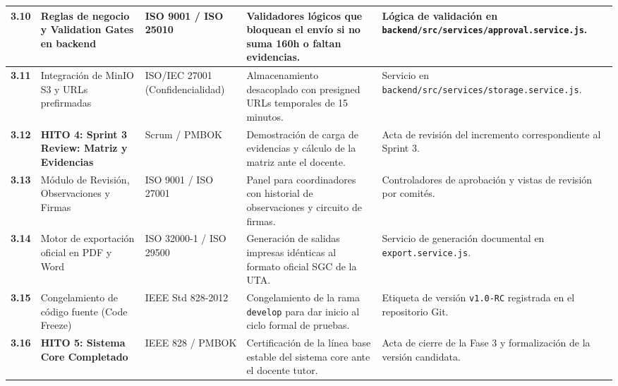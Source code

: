 \documentclass[12pt,a4paper]{article}
\begin{document}
\begin{longtable}{|>{\centering\arraybackslash}m{1.4cm}|>{\raggedright\arraybackslash}m{3.2cm}|>{\raggedright\arraybackslash}m{2.6cm}|>{\raggedright\arraybackslash}m{4.6cm}|>{\raggedright\arraybackslash}m{3.4cm}|}
\textbf{3.10} & Reglas de negocio y Validation Gates en backend & ISO 9001 / ISO 25010 & Validadores lógicos que bloquean el envío si no suma 160h o faltan evidencias. & Lógica de validación en \texttt{backend/src/services/approval.service.js}. \\ \hline
\textbf{3.11} & Integración de MinIO S3 y URLs prefirmadas & ISO/IEC 27001 (Confidencialidad) & Almacenamiento desacoplado con presigned URLs temporales de 15 minutos. & Servicio en \texttt{backend/src/services/storage.service.js}. \\ \hline
\textbf{3.12} & \textbf{HITO 4: Sprint 3 Review: Matriz y Evidencias} & Scrum / PMBOK & Demostración de carga de evidencias y cálculo de la matriz ante el docente. & Acta de revisión del incremento correspondiente al Sprint 3. \\ \hline
\textbf{3.13} & Módulo de Revisión, Observaciones y Firmas & ISO 9001 / ISO 27001 & Panel para coordinadores con historial de observaciones y circuito de firmas. & Controladores de aprobación y vistas de revisión por comités. \\ \hline
\textbf{3.14} & Motor de exportación oficial en PDF y Word & ISO 32000-1 / ISO 29500 & Generación de salidas impresas idénticas al formato oficial SGC de la UTA. & Servicio de generación documental en \texttt{export.service.js}. \\ \hline
\textbf{3.15} & Congelamiento de código fuente (Code Freeze) & IEEE Std 828-2012 & Congelamiento de la rama \texttt{develop} para dar inicio al ciclo formal de pruebas. & Etiqueta de versión \texttt{v1.0-RC} registrada en el repositorio Git. \\ \hline
\textbf{3.16} & \textbf{HITO 5: Sistema Core Completado} & IEEE 828 / PMBOK & Certificación de la línea base estable del sistema core ante el docente tutor. & Acta de cierre de la Fase 3 y formalización de la versión candidata. \\ \hline


\end{longtable}
\end{document}
